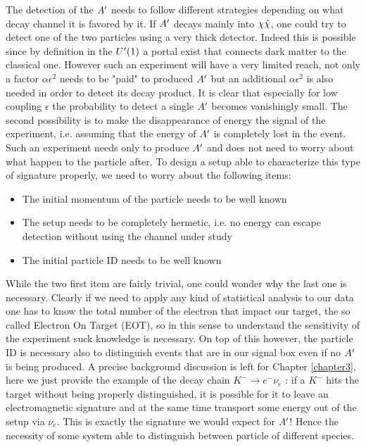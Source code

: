 The detection of the $A'$ needs to follow different strategies depending on what decay channel it is favored by it. If $A'$ decays mainly into $\chi \hat{\chi}$, one could try to detect one of the two particles using a very thick detector. Indeed this is possible since by definition in the $U'(1)$ a portal exist that connects dark matter to the classical one. However such an experiment will have a very limited reach, not only a factor $\alpha \epsilon^2$ needs to be "paid" to produced $A'$ but an additional $\alpha \epsilon^2$ is also needed in order to detect its decay product. It is clear that especially for low coupling $\epsilon$ the probability to detect a single $A'$ becomes  vanishingly  small. The second possibility is to make the disappearance of energy the signal of the experiment, i.e. assuming that the energy of $A'$ is completely lost in the event. Such an experiment needs only to produce $A'$ and does not need to worry about what happen to the particle after. To design a setup able to characterize this type of signature properly, we need to worry about the following items:

\begin{itemize}
\item The initial momentum of the particle needs to be well known
\item The setup needs to be completely hermetic, i.e. no energy can escape detection without using the channel under study
\item The initial particle ID needs to be well known
\end{itemize}

While the two first item are fairly trivial, one could wonder why the last one is necessary. Clearly if we need to apply any kind of statistical analysis to our data one has to know the total number of the electron that impact our target, the so called Electron On Target (EOT), so in this sense to understand the sensitivity of the experiment suck knowledge is necessary. On top of this however, the particle ID is necessary also to distinguish events that are in our signal box even if no $A'$ is being produced. A precise background discussion is left for Chapter \ref{chapter3}, here we just provide the example of the decay chain $K^- \to e^- \nu_e$ \cite{review-particle-physics}: if a $K^-$ hits the target without being properly distinguished, it is possible for it to leave an electromagnetic signature and at the same time transport some energy out of the setup via $\nu_e$. This is exactly the signature we would expect for $A'$! Hence the necessity of some system able to distinguish between particle of different species.

